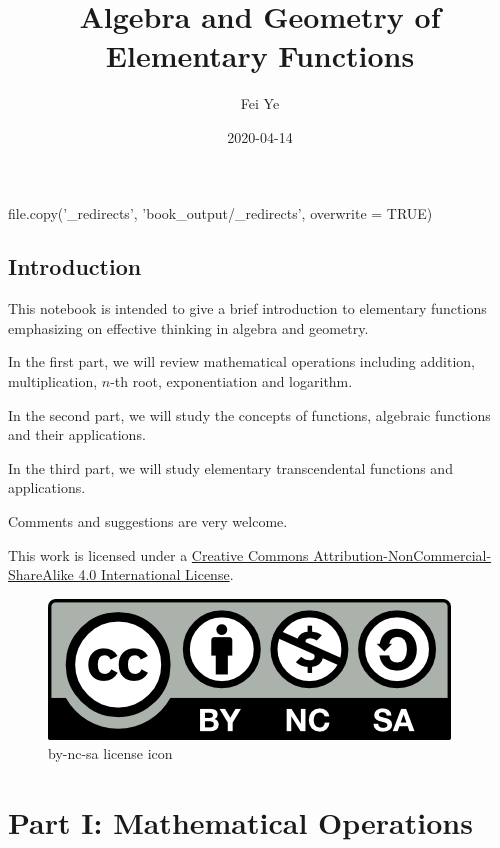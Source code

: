 \documentclass[
  en,11pt]{elegantbook}
\institute{QCC-CUNY}
\title{Algebra and Geometry of Elementary Functions}
\author{Fei Ye}
\date{2020-04-14}
\renewcommand{\baselinestretch}{1.1}
\renewcommand{\baselinestretch}{0.975}
\begin{document}
\maketitle

{
\setcounter{tocdepth}{0}
\tableofcontents
}
file.copy('\_redirects', 'book\_output/\_redirects', overwrite = TRUE)

\mainmatter

\hypersetup{pageanchor=true}

\renewcommand{\baselinestretch}{1.05}\normalsize

\captionsetup[figure]{labelformat=empty}
\captionsetup[subfigure]{labelformat=empty}

\hypertarget{introduction}{%
\chapter*{Introduction}\label{introduction}}

This notebook is intended to give a brief introduction to elementary functions emphasizing on effective thinking in algebra and geometry.

In the first part, we will review mathematical operations including addition, multiplication, \(n\)-th root, exponentiation and logarithm.

In the second part, we will study the concepts of functions, algebraic functions and their applications.

In the third part, we will study elementary transcendental functions and applications.

Comments and suggestions are very welcome.

This work is licensed under a \href{https://creativecommons.org/licenses/by-nc-sa/4.0/}{Creative Commons Attribution-NonCommercial-ShareAlike 4.0 International License}.

\begin{figure}
\centering
\includegraphics{figs/by-nc-sa.png}
\caption{by-nc-sa license icon}
\end{figure}

\hypertarget{part-part-i-mathematical-operations}{%
\part*{Part I: Mathematical Operations}\label{part-part-i-mathematical-operations}}
\end{document}
